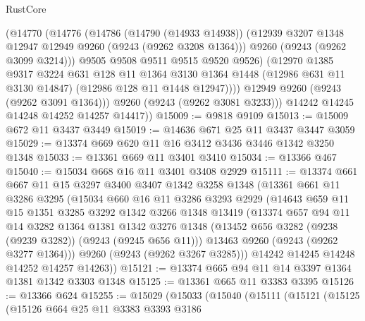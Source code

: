 \begin{lexlean}{RustCore}
\begin{coremodule}
              (@14770
                (@14776
                  (@14786
                    (@14790 (@14933 @14938))
                    (@12939 @3207 @1348 @12947 @12949 @9260 (@9243 (@9262 @3208 @1364)))
                    @9260
                    (@9243 (@9262 @3099 @3214)))
                  @9505
                  @9508
                  @9511
                  @9515
                  @9520
                  @9526)
                (@12970
                  @1385
                  @9317
                  @3224
                  @631
                  @128
                  @11
                  @1364
                  @3130
                  @1364
                  @1448
                  (@12986 @631 @11 @3130 @14847)
                  (@12986 @128 @11 @1448 @12947))))
            @12949
            @9260
            (@9243 (@9262 @3091 @1364)))
          @9260
          (@9243 (@9262 @3081 @3233)))
        @14242
        @14245
        @14248
        @14252
        @14257
        @14417))
@15009 := @9818 @9109
@15013 := @15009 @672 @11 @3437 @3449
@15019 := @14636 @671 @25 @11 @3437 @3447 @3059
@15029 := @13374 @669 @620 @11 @16 @3412 @3436 @3446 @1342 @3250 @1348
@15033 := @13361 @669 @11 @3401 @3410
@15034 := @13366 @467
@15040 := @15034 @668 @16 @11 @3401 @3408 @2929
@15111 := @13374
    @661
    @667
    @11
    @15
    @3297
    @3400
    @3407
    @1342
    @3258
    @1348
    (@13361
      @661
      @11
      @3286
      @3295
      (@15034
        @660
        @16
        @11
        @3286
        @3293
        @2929
        (@14643
          @659
          @11
          @15
          @1351
          @3285
          @3292
          @1342
          @3266
          @1348
          @13419
          (@13374
            @657
            @94
            @11
            @14
            @3282
            @1364
            @1381
            @1342
            @3276
            @1348
            (@13452 @656 @3282 (@9238 (@9239 @3282)) (@9243 (@9245 @656 @11)))
            @13463
            @9260
            (@9243 (@9262 @3277 @1364)))
          @9260
          (@9243 (@9262 @3267 @3285)))
        @14242
        @14245
        @14248
        @14252
        @14257
        @14263))
@15121 := @13374 @665 @94 @11 @14 @3397 @1364 @1381 @1342 @3303 @1348
@15125 := @13361 @665 @11 @3383 @3395
@15126 := @13366 @624
@15255 := @15029
    (@15033
      (@15040
        (@15111
          (@15121
            (@15125
              (@15126
                @664
                @25
                @11
                @3383
                @3393
                @3186

\end{coremodule}
\end{lexlean}
